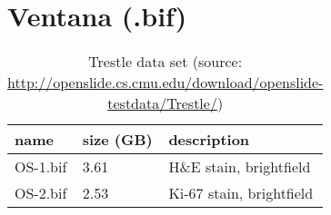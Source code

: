 \section{Ventana (.bif)}
\begin{table}[H]
	\begin{center}
		\begin{tabular}{| p{4cm} | p{2cm} | p{5cm} |}
			\hline
			\textbf{name} & \textbf{size (GB)} & \textbf{description} \\ \hline
			 OS-1.bif & 3.61 & H\&E stain, brightfield \\ \hline
			 OS-2.bif & 2.53 & Ki-67 stain, brightfield \\ \hline
 		\end{tabular}
		\caption{Trestle data set (source: \url{http://openslide.cs.cmu.edu/download/openslide-testdata/Trestle/})}
	\end{center}
\end{table}

